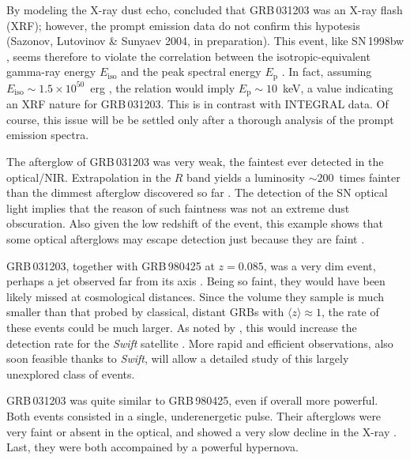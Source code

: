 \documentclass{emulateapj}
\newcommand{\ped}[2]{#1_\mathrm{#2}}
\begin{document}
By modeling the X-ray dust echo, \citet{Wa04} concluded that GRB\,031203
was an X-ray flash (XRF); however, the prompt emission data do not
confirm this hypotesis (Sazonov, Lutovinov \& Sunyaev 2004, in
preparation). This event, like SN\,1998bw \citep{Pi00}, seems therefore
to violate the correlation between the isotropic-equivalent gamma-ray
energy $\ped{E}{iso}$ and the peak spectral energy $\ped{E}{p}$
\citep{Am02,La03}. In fact, assuming $\ped{E}{iso} \sim 1.5
\times 10^{50}$~erg \citep[1-10000~keV;][]{Wa04}, the \citet{Am02}
relation would imply $\ped{E}{p} \sim 10$~keV, a value indicating an XRF
nature for GRB\,031203. This is in contrast with INTEGRAL data. Of
course, this issue will be be settled only after a thorough analysis of
the prompt emission spectra.

The afterglow of GRB\,031203 was very weak, the faintest ever detected
in the optical/NIR. Extrapolation in the $R$ band yields a luminosity
$\sim 200$~times fainter than the dimmest afterglow discovered so far
\citep[GRB\,021211:][]{Fo03,Pa03}. The detection of the SN optical light
implies that the reason of such faintness was not an extreme dust
obscuration. Also given the low redshift of the event, this example
shows that some optical afterglows may escape detection just because
they are faint \citep[e.g.][]{Fy01,La02,DP03}.

GRB\,031203, together with GRB\,980425 at $z = 0.085$, was a very dim
event, perhaps a jet observed far from its axis
\citep[e.g.][]{Ma02,Ya03}. Being so faint, they would have been likely
missed at cosmological distances. Since the volume they sample is much
smaller than that probed by classical, distant GRBs with $\langle z
\rangle \approx 1$, the rate of these events could be much larger.
As noted by \citet{Th04}, this would increase the detection rate for the
{\it Swift} satellite \citep{Ge04}. More rapid and efficient
observations, also soon feasible thanks to {\it Swift}, will allow a
detailed study of this largely unexplored class of events.

GRB\,031203 was quite similar to GRB\,980425, even if overall more
powerful. Both events consisted in a single, underenergetic pulse. Their
afterglows were very faint or absent in the optical, and showed a very
slow decline in the X-ray \citep{Pi00,Wa04}. Last, they were both
accompained by a powerful hypernova.

\end{document}
